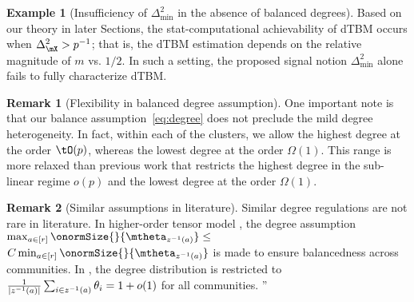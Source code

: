 \documentclass[lettersize,onecolumn,journal]{IEEEtran}
\theoremstyle{definition}
\theoremstyle{definition}
\newtheorem{example}{Example}
\newtheorem{rmk}{Remark}
\begin{document}
{\begin{example}[Insufficiency of $\Delta_{\min}^2$ in the absence of balanced degrees]
Based on our theory in later Sections, the stat-computational achievability of dTBM occurs when $\Delta^2_{\mX}>p^{-1}$; that is, the dTBM estimation depends on the relative magnitude of $m$ vs. $1/2$. In such a setting, the proposed signal notion $\Delta^2_{\min}$ alone fails to fully characterize dTBM. 
\end{example}

\begin{rmk}[Flexibility in balanced degree assumption] One important note is that our balance assumption~\eqref{eq:degree} does not preclude the mild degree heterogeneity. In fact, within each of the clusters, we allow the highest degree at the order $\tO(p)$, whereas the lowest degree at the order $\Omega(1)$. This range is more relaxed than previous work \citep{gao2018community} that restricts the highest degree in the sub-linear regime $o(p)$ and the lowest degree at the order $\Omega(1)$. 
\end{rmk}

\begin{rmk}[Similar assumptions in literature]
Similar degree regulations are not rare in literature. In higher-order tensor model \citep{ke2019community}, the degree assumption $\max_{a\in[r]} \onormSize{}{\mtheta_{z^{-1}(a)}} \leq $ $ C \min_{a\in[r]}\onormSize{}{\mtheta_{z^{-1}(a)}}$ is made to ensure balancedness across communities. %
In \cite{gao2018community}, the degree distribution is restricted to ${1\over |z^{-1}(a)|}\sum_{i\in z^{-1}(a)}\theta_i=1+o(1)$ for all communities. ''
\end{rmk}
}
\end{document}
